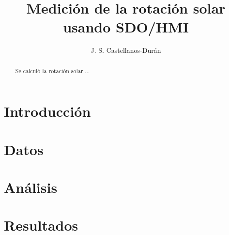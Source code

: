 \documentclass[12pt,letterpaper]{article}
\author{J. S. Castellanos-Durán}
\title{Medición de la rotación solar usando SDO/HMI}
\date{}
\begin{document}
 \maketitle
 
 \begin{abstract}
 Se calculó la rotación solar ...
 \end{abstract}
 
 \section{Introducción}
 \citep{Howard1990}
 \section{Datos}
 
 \section{Análisis}
 
 \section{Resultados}
 
 
 
 
 
\end{document}

